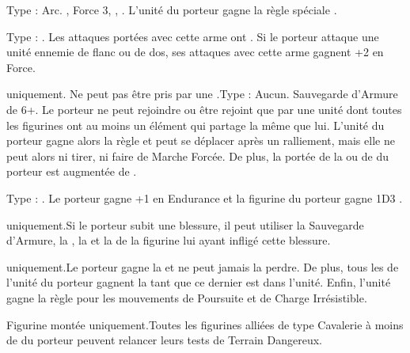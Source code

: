 Type : Arc. , Force 3, \lightningattacks{}, . L'unité du porteur gagne la règle spéciale \quicktofire{}.

Type : \hw{}. Les attaques portées avec cette arme ont . Si le porteur attaque une unité ennemie de flanc ou de dos, ses attaques avec cette arme gagnent +2 en Force.

\endpricelist

\armymagicalarmour

\startpricelist

\goblin{} uniquement. Ne peut pas être pris par une \largetarget{}.\newline Type : Aucun. Sauvegarde d'Armure de 6+. Le porteur ne peut rejoindre ou être rejoint que par une unité dont toutes les figurines ont au moins un élément qui partage la même \greenhiderace{} que lui. L'unité du porteur gagne alors la règle \vanguard{} et peut se déplacer après un ralliement, mais elle ne peut alors ni tirer, ni faire de Marche Forcée. De plus, la portée de la \inspiringpresence{} ou de \holdyourground{} du porteur est augmentée de .

Type : \ha{}. Le porteur gagne +1 en Endurance et la figurine du porteur gagne 1D3 \impacthits{}.

\endpricelist

\armytalismans

\startpricelist

\goblin{} uniquement.\newline Si le porteur subit une blessure, il peut utiliser la Sauvegarde d'Armure, la \wardsave{}, la \regeneration{} et la \magicresistance{} de la figurine lui ayant infligé cette blessure.

\endpricelist

\armyenchanteditems

\startpricelist

\feralorc{} uniquement.\newline Le porteur gagne la \frenzy{} et ne peut jamais la perdre. De plus, tous les \feralorcs{} de l'unité du porteur gagnent la \frenzy{} tant que ce dernier est dans l'unité. Enfin, l'unité gagne la règle \swiftstride{} pour les mouvements de Poursuite et de Charge Irrésistible.

Figurine montée uniquement.\newline Toutes les figurines alliées de type Cavalerie à moins de  du porteur peuvent relancer leurs tests de Terrain Dangereux.

